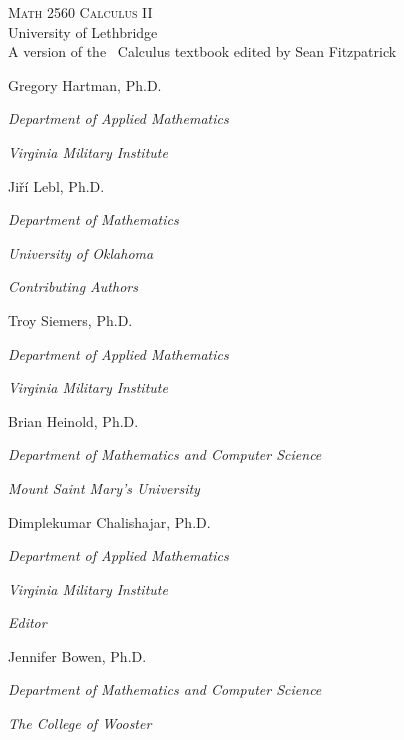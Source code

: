 
\hskip 125pt\begin{minipage}{\textwidth}
\begin{flushright}

\textsc{{\Huge Math 2560 Calculus II}} \\

{\large University of Lethbridge}\\

{A version of the \apex\ Calculus textbook edited by Sean Fitzpatrick}

\bigskip

\Large

Gregory Hartman, Ph.D.

\emph{\small Department of Applied Mathematics}

\emph{\small Virginia Military Institute}\vskip15pt

Ji{\v r}\'i Lebl, Ph.D.

\emph{\small Department of Mathematics}

\emph{\small University of Oklahoma}

\parbox{200pt}{\textit{Contributing Authors}}\hskip 2cm \phantom{.}

Troy Siemers, Ph.D.

\emph{\small Department of Applied Mathematics}

\emph{\small Virginia Military Institute}\vskip 15pt

Brian Heinold, Ph.D.

\emph{\small Department of Mathematics and Computer Science}

\emph{\small Mount Saint Mary's University}\vskip 15pt

Dimplekumar Chalishajar, Ph.D.

\emph{\small Department of Applied Mathematics}

\emph{\small Virginia Military Institute}\vskip 25pt



\parbox{200pt}{\textit{Editor}}\hskip 2cm \phantom{.}

Jennifer Bowen, Ph.D.

\emph{\small Department of Mathematics and Computer Science}

\emph{\small The College of Wooster}


\normalsize
\end{flushright}
\end{minipage}

